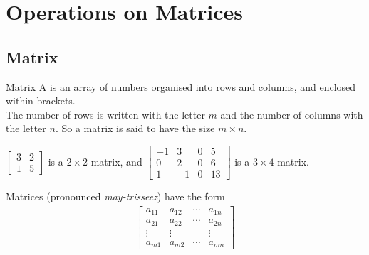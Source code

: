 \documentclass[../notes.tex]{subfiles}
\begin{document}
		\section{Operations on Matrices}
			\subsection{Matrix}
				\begin{definition}{Matrix}
					A  is an array of numbers organised into rows and columns, and enclosed within brackets.\\
					The number of rows is written with the letter $m$ and the number of columns with the letter $n$. So a matrix is said to have the size $m \times n$.
				\end{definition}
				\begin{example}[hbox]
					$\begin{bmatrix}
						3 & 2\\
						1 & 5
					\end{bmatrix}$ is a $2 \times 2$ matrix, and
					$\begin{bmatrix}
						-1 & 3 & 0 & 5\\
						0 & 2 & 0 & 6\\
						1 & - 1& 0 & 13
					\end{bmatrix}$ is a $3 \times 4$ matrix.
				\end{example}
				Matrices (pronounced \emph{may-trisseez}) have the form 
				\begin{align*}
					\begin{bmatrix}
						a_{11} & a_{12} & \cdots & a_{1n}\\
						a_{21} & a_{22} & \cdots & a_{2n}\\
						\vdots & \vdots & & \vdots\\
						a_{m1} & a_{m2} & \cdots & a_{mn}
					\end{bmatrix}
				\end{align*}
\end{document}

